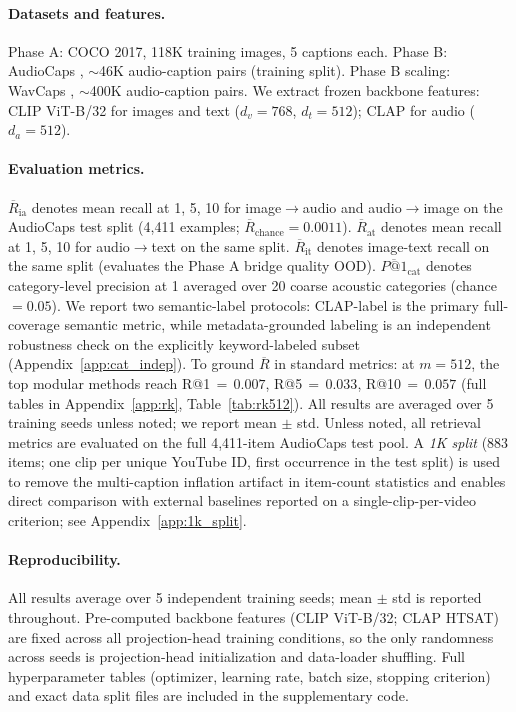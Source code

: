 \documentclass{article}
\newcommand{\avgR}{\overline{R}}
\begin{document}
\paragraph{Datasets and features.}
Phase A: COCO 2017, 118K training images, 5 captions each.
Phase B: AudioCaps \citep{kim2019audiocaps}, $\sim$46K audio-caption pairs (training split).
Phase B scaling: WavCaps \citep{mei2023wavcaps}, $\sim$400K audio-caption pairs.
We extract frozen backbone features: CLIP ViT-B/32 for images and text ($d_v=768$, $d_t=512$); CLAP \citep{elizalde2022clap} for audio ($d_a=512$).

\paragraph{Evaluation metrics.}
$\avgR_\mathrm{ia}$ denotes mean recall at 1, 5, 10 for image$\to$audio and audio$\to$image on the AudioCaps test split (4,411 examples; $\avgR_\mathrm{chance} = 0.0011$).
$\avgR_\mathrm{at}$ denotes mean recall at 1, 5, 10 for audio$\to$text on the same split.
$\avgR_\mathrm{it}$ denotes image-text recall on the same split (evaluates the Phase A bridge quality OOD).
$\overline{P\text{@}1}_{\mathrm{cat}}$ denotes category-level precision at 1 averaged over 20 coarse acoustic categories (chance $= 0.05$).
We report two semantic-label protocols: CLAP-label is the primary full-coverage semantic metric, while metadata-grounded labeling is an independent robustness check on the explicitly keyword-labeled subset (Appendix~\ref{app:cat_indep}).
To ground $\avgR$ in standard metrics: at $m=512$, the top modular methods reach R@1$\,{=}\,0.007$, R@5$\,{=}\,0.033$, R@10$\,{=}\,0.057$ (full tables in Appendix~\ref{app:rk}, Table~\ref{tab:rk512}).
All results are averaged over 5 training seeds unless noted; we report mean $\pm$ std.
Unless noted, all retrieval metrics are evaluated on the full 4,411-item AudioCaps test pool.
A \emph{1K split} (883 items; one clip per unique YouTube ID, first occurrence in the test split) is used to remove the multi-caption inflation artifact in item-count statistics and enables direct comparison with external baselines reported on a single-clip-per-video criterion; see Appendix~\ref{app:1k_split}.

\paragraph{Reproducibility.}
All results average over 5 independent training seeds; mean $\pm$ std is reported throughout.
Pre-computed backbone features (CLIP ViT-B/32; CLAP HTSAT) are fixed across all projection-head training conditions, so the only randomness across seeds is projection-head initialization and data-loader shuffling.
Full hyperparameter tables (optimizer, learning rate, batch size, stopping criterion) and exact data split files are included in the supplementary code.
\end{document}
